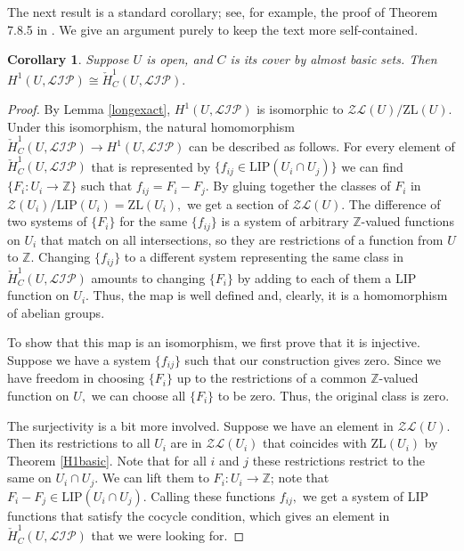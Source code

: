 \documentclass[10pt]{article}
\newtheorem{corollary}[theorem]{Corollary}
\theoremstyle{definition}
\begin{document}
The next result is a standard corollary; see, for example, the proof of Theorem 7.8.5 in \cite{Taylor}. We give an argument purely to keep the text more self-contained.
\begin{corollary}\label{H1Cech=H1} Suppose $U$ is open, and $C$ is its cover by almost basic sets. Then $H^1(U,\mathcal{LIP})\cong \check{H}^1_C(U,\mathcal{LIP}).$ 
\end{corollary}

\begin{proof} By Lemma \ref{longexact}, $H^1(U,\mathcal{LIP})$ is isomorphic to $\mathcal{ZL}(U) / \textrm{ZL}(U).$ Under this isomorphism, the natural homomorphism $\check{H}^1_C(U,\mathcal{LIP}) \to H^1(U,\mathcal{LIP})$ can be described as follows. For every element of $\check{H}^1_C(U,\mathcal{LIP})$ that is represented by $\{f_{ij} \in \textrm{LIP}(U_i\cap U_j)\}$  we can find $\{F_i: U_i\to \mathbb Z\}$ such that $f_{ij}=F_i-F_j.$ By gluing together the classes of $F_i$ in $\mathcal{Z}(U_i)/\textrm{LIP}(U_i)=\textrm{ZL}(U_i),$ we get a section of $\mathcal{ZL}(U).$ The difference of two systems of $\{F_i\}$ for the same $\{f_{ij}\}$ is a system of arbitrary $\mathbb Z$-valued functions on $U_i$ that match on all intersections, so they are restrictions of a function from $U$ to $\mathbb Z.$ Changing $\{f_{ij}\}$ to a different system representing the same class in $\check{H}^1_C(U,\mathcal{LIP})$ amounts to changing $\{F_i\}$ by adding to each of them a LIP function on $U_i.$ Thus, the map is well defined and, clearly, it is a homomorphism of abelian groups.

To show that this map is an isomorphism, we first prove that it is injective. Suppose we have a system $\{f_{ij}\}$ such that our construction gives zero. Since we have freedom in choosing $\{F_i\}$ up to the restrictions of a common $\mathbb Z$-valued function on $U,$ we can choose all $\{F_i\}$ to be zero. Thus, the original class is zero. 

The surjectivity is a bit more involved. Suppose we have an element in $\mathcal{ZL}(U)$. Then its restrictions to all $U_i$ are in $\mathcal{ZL}(U_i)$ that coincides with $\textrm{ZL}(U_i)$ by Theorem \ref{H1basic}. Note that for all $i$ and $j$ these restrictions restrict to the same on $U_i\cap U_j.$ We can lift them to $F_i: U_i \to \mathbb Z$; note that $F_i-F_j\in \textrm{LIP}(U_i\cap U_j).$ Calling these functions $f_{ij},$ we get a system of LIP functions that satisfy the cocycle condition, which gives an element in $\check{H}^1_C(U,\mathcal{LIP}) $ that we were looking for.
\end{proof}
\end{document}
